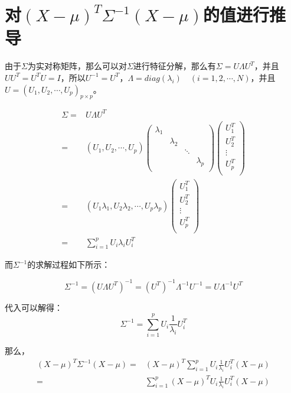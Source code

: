 \documentclass[a4paper]{article}
\begin{document}
\section{对$(X-\mu)^T\Sigma^{-1}(X-\mu)$的值进行推导}
由于$\Sigma$为实对称矩阵，那么可以对$\Sigma$进行特征分解，那么有$\Sigma = U\Lambda U^T$，并且$UU^T=U^TU=I$，所以$U^{-1}=U^T$，$\Lambda=diag(\lambda_i)\quad(i=1,2,\cdots,N)$，并且$U=(U_1,U_2,\cdots,U_p)_{p\times p}$。

\begin{align}
    \Sigma = & U\Lambda U^T \\
    = & (U_1,U_2,\cdots,U_p)
    \begin{pmatrix}
        \lambda_1 & & & \\
        & \lambda_2 & & \\
        & & \ddots & \\
        & & & \lambda_p \\
    \end{pmatrix}
    \begin{pmatrix}
        U_1^T  \\
        U_2^T  \\
        \vdots \\
        U_p^T  \\
    \end{pmatrix} \\
     = & (U_1\lambda_1,U_2\lambda_2,\cdots,U_p\lambda_p)
     \begin{pmatrix}
        U_1^T  \\
        U_2^T  \\
        \vdots \\
        U_p^T  \\
    \end{pmatrix} \\
    = & \sum_{i=1}^{p}U_i\lambda_i U_i^T
\end{align}

而$\Sigma^{-1}$的求解过程如下所示：

\begin{equation}
    \Sigma^{-1} = (U \Lambda U^T)^{-1} = (U^T)^{-1} \Lambda^{-1} U^{-1} = U \Lambda^{-1} U^T
\end{equation}

代入可以解得：
\begin{equation}
    \Sigma^{-1} = \sum_{i=1}^{p}U_i\frac{1}{\lambda_i} U_i^T
\end{equation}

那么，
\begin{align}
    (X-\mu)^T\Sigma^{-1}(X-\mu) = & (X-\mu)^T\sum_{i=1}^{p}U_i\frac{1}{\lambda_i} U_i^T(X-\mu) \\
    = & \sum_{i=1}^{p} (X-\mu)^TU_i\frac{1}{\lambda_i} U_i^T(X-\mu)
\end{align}
\end{document}
